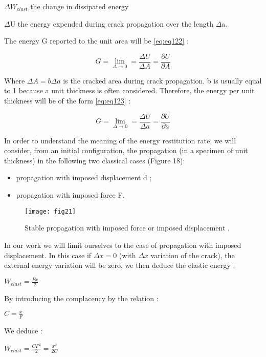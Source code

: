 $\Delta W_{elast}$ the change in dissipated energy 

$\Delta$U the energy expended during crack propagation over the length $\Delta$a.

The energy G reported to the unit area will be \ref{eq:eq122} :

\begin{equation}
	G = \lim_{\Delta \to 0}= \frac{\Delta U}{\Delta A}= \frac{\partial U}{\partial A}
	\label{eq:eq122}
\end{equation}

Where $\Delta A=b\Delta a$  is the cracked area during crack propagation. b is usually equal to 1 because a unit thickness is often considered. Therefore, the energy per unit thickness will be of the form \ref{eq:eq123} :

\begin{equation}
	G = \lim_{\Delta \to 0}= \frac{\Delta U}{\Delta a}= \frac{\partial U}{\partial a}
	\label{eq:eq123}
\end{equation}

In order to understand the meaning of the energy restitution rate, we will consider, from an initial configuration, the propagation (in a specimen of unit thickness) in the following two classical cases (Figure 18):

\begin{itemize}
	\item propagation with imposed displacement d ; 
	\item propagation with imposed force F.
\end{itemize}

\begin{figure}[htp]
	\centering
	\texttt{[image: fig21]}
	\caption{Stable propagation with imposed force or imposed displacement \cite{Zeghloul2001phd}.}
	\label{fig:fig21}
\end{figure}

In our work we will limit ourselves to the case of propagation with imposed displacement. In this case if $\Delta x=0$ (with $\Delta x$ variation of the crack), the external energy variation will be zero, we then deduce the elastic energy :

$W_{elast}=\frac{Fx}{2}$

By introducing the complacency by the relation :

$C=\frac{x}{F}$

We deduce :

$W_{elast}=\frac{CF^2}{2}=\frac{x^2}{2C}$


